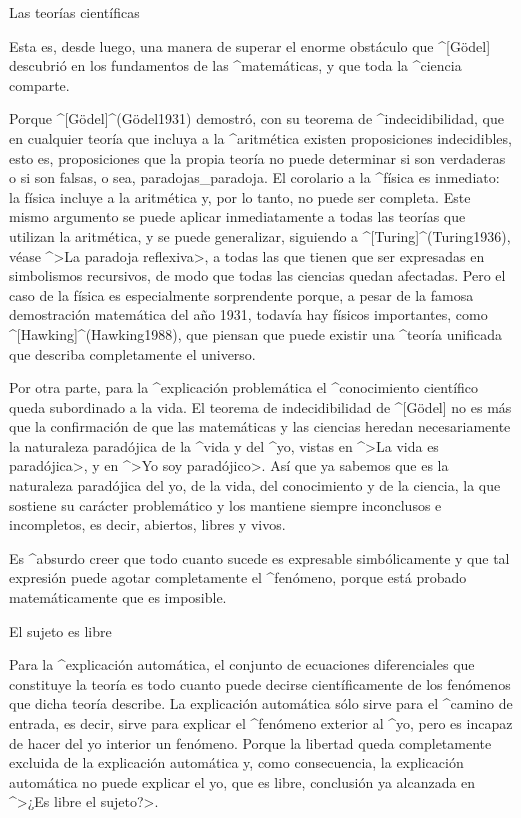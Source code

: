 \Section Las teorías científicas

Esta es, desde luego, una manera de superar el enorme obstáculo que
^[Gödel] descubrió en los fundamentos de las ^{matemáticas}, y que toda
la ^{ciencia} comparte.

Porque ^[Gödel]^(G\"odel1931) demostró, con su teorema de
^{indecidibilidad}, que en cualquier teoría que incluya a la
^{aritmética} existen proposiciones indecidibles, esto es, proposiciones
que la propia teoría no puede determinar si son verdaderas o si son
falsas, o sea, paradojas_{paradoja}. El corolario a la ^{física} es
inmediato: la física incluye a la aritmética y, por lo tanto, no puede
ser completa. Este mismo argumento se puede aplicar inmediatamente a
todas las teorías que utilizan la aritmética, y se puede generalizar,
siguiendo a ^[Turing]^(Turing1936), véase ^>La paradoja reflexiva>, a
todas las que tienen que ser expresadas en simbolismos recursivos, de
modo que todas las ciencias quedan afectadas. Pero el caso de la física
es especialmente sorprendente porque, a pesar de la famosa demostración
matemática del año 1931, todavía hay físicos importantes, como
^[Hawking]^(Hawking1988), que piensan que puede existir una ^{teoría
unificada} que describa completamente el universo.

Por otra parte, para la ^{explicación problemática} el ^{conocimiento}
científico queda subordinado a la vida. El teorema de indecidibilidad de
^[Gödel] no es más que la confirmación de que las matemáticas y las
ciencias heredan necesariamente la naturaleza paradójica de la ^{vida} y
del ^{yo}, vistas en ^>La vida es paradójica>, y en ^>Yo soy
paradójico>. Así que ya sabemos que es la naturaleza paradójica del yo,
de la vida, del conocimiento y de la ciencia, la que sostiene su
carácter problemático y los mantiene siempre inconclusos e incompletos,
es decir, abiertos, libres y vivos.

Es ^{absurdo} creer que todo cuanto sucede es expresable simbólicamente y
que tal expresión puede agotar completamente el ^{fenómeno}, porque está
probado matemáticamente que es imposible.


\Section El sujeto es libre

Para la ^{explicación automática}, el conjunto de ecuaciones
diferenciales que constituye la teoría es todo cuanto puede decirse
científicamente de los fenómenos que dicha teoría describe. La
explicación automática sólo sirve para el ^{camino de entrada}, es
decir, sirve para explicar el ^{fenómeno} exterior al ^{yo}, pero es
incapaz de hacer del yo interior un fenómeno. Porque la libertad queda
completamente excluida de la explicación automática y, como
consecuencia, la explicación automática no puede explicar el yo, que es
libre, conclusión ya alcanzada en ^>¿Es libre el sujeto?>.

